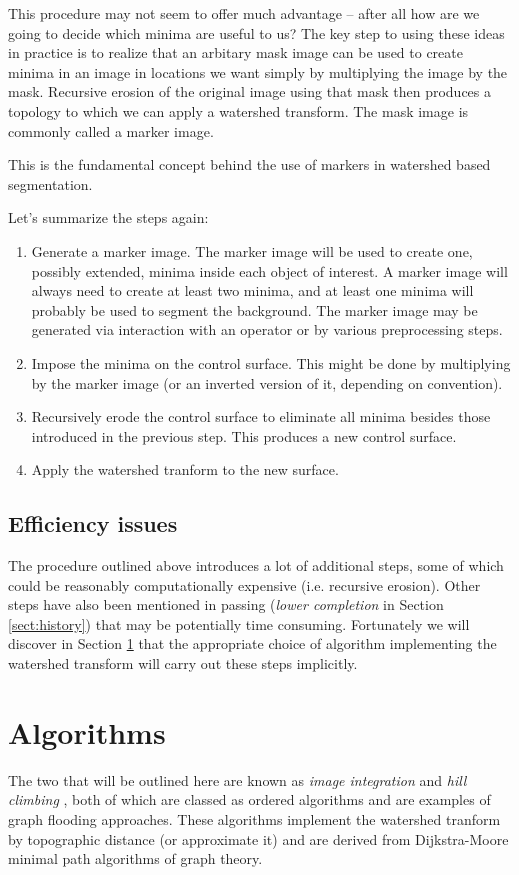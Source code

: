 \documentclass{InsightArticle}
\begin{document}
This procedure may not seem to offer much advantage -- after all how
are we going to decide which minima are useful to us? The key step to
using these ideas in practice is to realize that an arbitary mask
image can be used to create minima in an image in locations we want
simply by multiplying the image by the mask. Recursive erosion of the
original image using that mask then produces a topology to which we
can apply a watershed transform. The mask image is commonly called a
marker image.

This is the fundamental concept behind the use of markers in watershed
based segmentation.

Let's summarize the steps again:

\begin{enumerate}
\item Generate a marker image. The marker image will be used to create 
one, possibly extended, minima inside each object of interest. A
marker image will always need to create at least two minima, and at
least one minima will probably be used to segment the background. The
marker image may be generated via interaction with an operator or by
various preprocessing steps.
\item \label{recipe:min}Impose the minima on the control surface. This 
might be done by multiplying by the marker image (or an inverted
version of it, depending on convention).
\item \label{recipe:erode}Recursively erode the control surface to eliminate all minima besides those introduced in the previous step. This produces a new control surface.
\item Apply the watershed tranform to the new surface.
\end{enumerate}

\subsection{Efficiency issues}
The procedure outlined above introduces a lot of additional steps,
some of which could be reasonably computationally expensive
(i.e. recursive erosion). Other steps have also been mentioned in
passing ({\em lower completion} in Section \ref{sect:history}) that may
be potentially time consuming. Fortunately we will discover in Section
\ref{sect:algorithms} that the appropriate choice of algorithm implementing the
watershed transform will carry out these steps implicitly.

\section{Algorithms}
\label{sect:algorithms}
The two that will be outlined here are known as {\em image
integration}\cite{Meyer1994a} and {\em hill climbing}
\cite{Beucher93a}, both of which are classed as ordered
algorithms and are examples of graph flooding approaches. These
algorithms implement the watershed tranform by topographic distance
(or approximate it) and are derived from Dijkstra-Moore minimal path
algorithms of graph theory.
\end{document}
